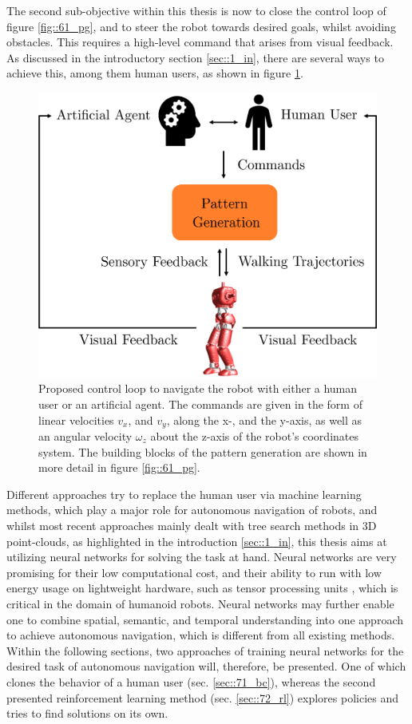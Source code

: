 \label{sec::7_ah}
The second sub-objective within this thesis is now to close the control loop of figure \ref{fig::61_pg}, and to steer the robot towards desired goals, whilst avoiding obstacles. This requires a high-level command that arises from visual feedback. As discussed in the introductory section \ref{sec::1_in}, there are several ways to achieve this, among them human users, as shown in figure \ref{fig::7_cl}.
\begin{figure}[h!]
	\centering
	\includegraphics[scale=.5]{chapters/07_autonomous_high_level_control_of_the_walking_pattern_generator/img/control_loop.png}
	\caption{Proposed control loop to navigate the robot with either a human user or an artificial agent. The commands are given in the form of linear velocities $v_x$, and $v_y$, along the x-, and the y-axis, as well as an angular velocity $\omega_z$ about the z-axis of the robot's coordinates system. The building blocks of the pattern generation are shown in more detail in figure \ref{fig::61_pg}.}
	\label{fig::7_cl}
\end{figure}
Different approaches try to replace the human user via machine learning methods, which play a major role for autonomous navigation of robots, and whilst most recent approaches mainly dealt with tree search methods in 3D point-clouds, as highlighted in the introduction \ref{sec::1_in}, this thesis aims at utilizing neural networks for solving the task at hand. Neural networks are very promising for their low computational cost, and their ability to run with low energy usage on lightweight hardware, such as tensor processing units \cite{jouppi2017datacenter}, which is critical in the domain of humanoid robots. Neural networks may further enable one to combine spatial, semantic, and temporal understanding into one approach to achieve autonomous navigation, which is different from all existing methods. Within the following sections, two approaches of training neural networks for the desired task of autonomous navigation will, therefore, be presented. One of which clones the behavior of a human user (sec. \ref{sec::71_bc}), whereas the second presented reinforcement learning method (sec. \ref{sec::72_rl}) explores policies and tries to find solutions on its own. 